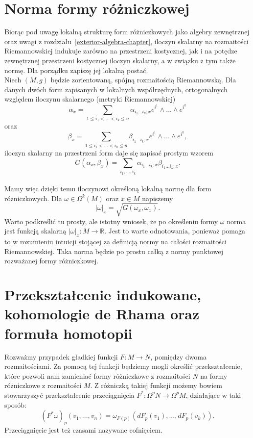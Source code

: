 \documentclass[licencjacka]{pracamgr}
\theoremstyle{definition}
\theoremstyle{definition}
\theoremstyle{plain}
\theoremstyle{plain}
\theoremstyle{plain}
\theoremstyle{plain}
\begin{document}
\section{Norma formy różniczkowej}
Biorąc pod uwagę lokalną strukturę form różniczkowych jako algebry
zewnętrznej oraz uwagi z rozdziału~\ref{exterior-algebra-chapter},
iloczyn skalarny na rozmaitości Riemannowskiej indukuje zarówno na
przestrzeni kostycznej, jak i na potędze zewnętrznej przestrzeni
kostycznej iloczyn skalarny, a w związku z tym także normę. Dla
porządku zapiszę jej lokalną postać. \\

Niech $(M, g)$ będzie zorientowaną, spójną 
rozmaitością Riemannowską.
Dla danych dwóch form zapisanych w lokalnych współrzędnych, ortogonalnych
względem iloczynu skalarnego (metryki Riemannowskiej)
\[
\alpha_x = \sum_{1 \leq i_1 < ... < i_k \leq n} \alpha_{i_1 ... i_k; x} e^{i^1}
\wedge ...  \wedge e^{i^k}
\]
 oraz
\[ \beta_x = \sum_{1 \leq i_1 < ... < i_k \leq n} \beta_{i_1 ... i_k; x} e^{i^1}
\wedge ...  \wedge e^{i^k},
\]
iloczyn skalarny na przestrzeni form daje się zapisać prostym wzorem
\[
    G(\alpha_x, \beta_x) = \sum_{i_1, ..., i_k} \alpha_{i_1 ... i_k; x}
                                                    \beta_{i_1 ... i_k; x}.
\] \\


Mamy więc dzięki temu iloczynowi określoną lokalną normę dla form różniczkowych.
Dla $\omega \in \Omega^k(M)$ oraz $x \in M$ napiszemy
\[
    |\omega|_x = \sqrt{ G(\omega_x, \omega_x) }.
\]
Warto podkreślić tu prosty, ale istotny wniosek, że po określeniu formy $\omega$
norma jest funkcją skalarną $| \omega |_x : M \rightarrow \mathbb{R} $. Jest to warte
odnotowania, ponieważ pomaga to w rozumieniu intuicji stojącej za definicją normy
na całości rozmaitości Riemannowskiej. Taka norma będzie po prostu całką 
z normy punktowej rozważanej formy różniczkowej. \\


\section{Przekształcenie indukowane, kohomologie de Rhama oraz formuła homotopii}
Rozważmy przypadek gładkiej funkcji $F: M \rightarrow N$, pomiędzy
dwoma rozmaitościami. Za pomocą tej
funkcji będziemy mogli określić przekształcenie, które pozwoli nam
zamieniać formy różniczkowe z rozmaitości $N$ na formy różniczkowe z
rozmaitości $M$. Z różniczką takiej funkcji możemy bowiem stowarzyszyć
przekształcenie
przeciągnięcia $F^\ast: \Omega^p N \rightarrow \Omega^p M$, działające w taki sposób:
\[
    (F^\ast \omega)_p(v_1, ..., v_n) =
        \omega_{F(p)}(dF_p(v_1), ..., dF_p(v_k)).
\] Przeciągnięcie jest też czasami nazywane cofnięciem. \\
\end{document}
